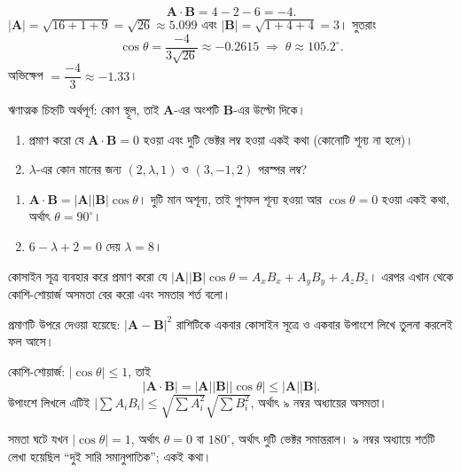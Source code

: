 \documentclass[11pt]{article}
\begin{document}
\begin{sol}
\[
  \mathbf{A}\cdot\mathbf{B} = 4 - 2 - 6 = -4 .
\]
$|\mathbf{A}| = \sqrt{16+1+9} = \sqrt{26} \approx 5.099$ এবং
$|\mathbf{B}| = \sqrt{1+4+4} = 3$। সুতরাং
\[
  \cos\theta = \frac{-4}{3\sqrt{26}} \approx -0.2615
  \;\Longrightarrow\; \theta \approx 105.2^{\circ} .
\]
অভিক্ষেপ $= \dfrac{-4}{3} \approx -1.33$।

ঋণাত্মক চিহ্নটি অর্থপূর্ণ: কোণ স্থূল, তাই $\mathbf{A}$-এর অংশটি
$\mathbf{B}$-এর উল্টো দিকে।
\end{sol}

 \begin{enumerate}
  \item প্রমাণ করো যে $\mathbf{A}\cdot\mathbf{B} = 0$ হওয়া এবং দুটি ভেক্টর
        লম্ব হওয়া একই কথা (কোনোটি শূন্য না হলে)।
  \item $\lambda$-এর কোন মানের জন্য $(2, \lambda, 1)$ ও $(3,-1,2)$ পরস্পর
        লম্ব?
\end{enumerate}

\begin{sol}
\begin{enumerate}
  \item $\mathbf{A}\cdot\mathbf{B} = |\mathbf{A}||\mathbf{B}|\cos\theta$।
        দুটি মান অশূন্য, তাই গুণফল শূন্য হওয়া আর $\cos\theta = 0$ হওয়া একই
        কথা, অর্থাৎ $\theta = 90^{\circ}$।
  \item $6 - \lambda + 2 = 0$ দেয় $\lambda = 8$।
\end{enumerate}
\end{sol}

 কোসাইন সূত্র ব্যবহার করে প্রমাণ করো যে
$|\mathbf{A}||\mathbf{B}|\cos\theta = A_{x}B_{x}+A_{y}B_{y}+A_{z}B_{z}$।
এরপর এখান থেকে কোশি-শোয়ার্জ অসমতা বের করো এবং সমতার শর্ত বলো।

\begin{sol}
প্রমাণটি উপরে দেওয়া হয়েছে: $|\mathbf{A}-\mathbf{B}|^{2}$ রাশিটিকে একবার
কোসাইন সূত্রে ও একবার উপাংশে লিখে তুলনা করলেই ফল আসে।

কোশি-শোয়ার্জ: $|\cos\theta| \leq 1$, তাই
\[
  \left| \mathbf{A}\cdot\mathbf{B} \right|
  = |\mathbf{A}||\mathbf{B}|\left| \cos\theta \right|
  \leq |\mathbf{A}||\mathbf{B}| .
\]
উপাংশে লিখলে এটিই
$\left| \sum A_{i}B_{i} \right| \leq \sqrt{\sum A_{i}^{2}}
\sqrt{\sum B_{i}^{2}}$, অর্থাৎ ৯ নম্বর অধ্যায়ের অসমতা।

সমতা ঘটে যখন $|\cos\theta| = 1$, অর্থাৎ $\theta = 0$ বা $180^{\circ}$,
অর্থাৎ দুটি ভেক্টর সমান্তরাল। ৯ নম্বর অধ্যায়ে শর্তটি লেখা হয়েছিল
``দুই সারি সমানুপাতিক''; একই কথা।
\end{sol}
\end{document}
